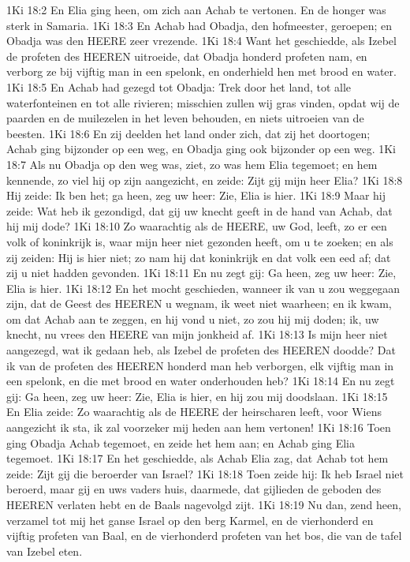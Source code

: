1Ki 18:2  En Elia ging heen, om zich aan Achab te vertonen. En de honger was sterk in Samaria.
1Ki 18:3  En Achab had Obadja, den hofmeester, geroepen; en Obadja was den HEERE zeer vrezende.
1Ki 18:4  Want het geschiedde, als Izebel de profeten des HEEREN uitroeide, dat Obadja honderd profeten nam, en verborg ze bij vijftig man in een spelonk, en onderhield hen met brood en water.
1Ki 18:5  En Achab had gezegd tot Obadja: Trek door het land, tot alle waterfonteinen en tot alle rivieren; misschien zullen wij gras vinden, opdat wij de paarden en de muilezelen in het leven behouden, en niets uitroeien van de beesten.
1Ki 18:6  En zij deelden het land onder zich, dat zij het doortogen; Achab ging bijzonder op een weg, en Obadja ging ook bijzonder op een weg.
1Ki 18:7  Als nu Obadja op den weg was, ziet, zo was hem Elia tegemoet; en hem kennende, zo viel hij op zijn aangezicht, en zeide: Zijt gij mijn heer Elia?
1Ki 18:8  Hij zeide: Ik ben het; ga heen, zeg uw heer: Zie, Elia is hier.
1Ki 18:9  Maar hij zeide: Wat heb ik gezondigd, dat gij uw knecht geeft in de hand van Achab, dat hij mij dode?
1Ki 18:10  Zo waarachtig als de HEERE, uw God, leeft, zo er een volk of koninkrijk is, waar mijn heer niet gezonden heeft, om u te zoeken; en als zij zeiden: Hij is hier niet; zo nam hij dat koninkrijk en dat volk een eed af; dat zij u niet hadden gevonden.
1Ki 18:11  En nu zegt gij: Ga heen, zeg uw heer: Zie, Elia is hier.
1Ki 18:12  En het mocht geschieden, wanneer ik van u zou weggegaan zijn, dat de Geest des HEEREN u wegnam, ik weet niet waarheen; en ik kwam, om dat Achab aan te zeggen, en hij vond u niet, zo zou hij mij doden; ik, uw knecht, nu vrees den HEERE van mijn jonkheid af.
1Ki 18:13  Is mijn heer niet aangezegd, wat ik gedaan heb, als Izebel de profeten des HEEREN doodde? Dat ik van de profeten des HEEREN honderd man heb verborgen, elk vijftig man in een spelonk, en die met brood en water onderhouden heb?
1Ki 18:14  En nu zegt gij: Ga heen, zeg uw heer: Zie, Elia is hier, en hij zou mij doodslaan.
1Ki 18:15  En Elia zeide: Zo waarachtig als de HEERE der heirscharen leeft, voor Wiens aangezicht ik sta, ik zal voorzeker mij heden aan hem vertonen!
1Ki 18:16  Toen ging Obadja Achab tegemoet, en zeide het hem aan; en Achab ging Elia tegemoet.
1Ki 18:17  En het geschiedde, als Achab Elia zag, dat Achab tot hem zeide: Zijt gij die beroerder van Israel?
1Ki 18:18  Toen zeide hij: Ik heb Israel niet beroerd, maar gij en uws vaders huis, daarmede, dat gijlieden de geboden des HEEREN verlaten hebt en de Baals nagevolgd zijt.
1Ki 18:19  Nu dan, zend heen, verzamel tot mij het ganse Israel op den berg Karmel, en de vierhonderd en vijftig profeten van Baal, en de vierhonderd profeten van het bos, die van de tafel van Izebel eten.
